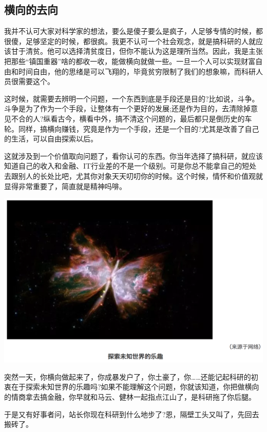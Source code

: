 \documentclass[]{book}
\begin{document}
\hypertarget{ux6a2aux5411ux7684ux53bbux5411}{%
\subsection{横向的去向}\label{ux6a2aux5411ux7684ux53bbux5411}}

我并不认可大家对科学家的想法，要么是傻子要么是疯子，人足够专情的时候，都很傻，足够坚定的时候，都很疯。我更不认可一个社会观念，就是搞科研的人就应该甘于清贫。他可以选择清贫度日，但你不能认为这是理所当然。因此，我是主张把那些``镇国重器''啥的都收一收，能做横向就做一些。一旦一个人可以实现财富自由和时间自由，他的思绪是可以飞翔的，毕竟贫穷限制了我们的想象嘛，而科研人员很需要这个。

这时候，就需要去辨明一个问题，一个东西到底是手段还是目的?比如说，斗争。斗争是为了作为一个手段，让整体有一个更好的发展;还是作为目的，去清除掉意见不合的人?纵看古今，横看中外，搞不清这个问题的，最后都只是倒历史的车轮。同样，搞横向赚钱，究竟是作为一个手段，还是一个目的?尤其是改善了自己的生活，可以自由探索以后。

这就涉及到一个价值取向问题了，看你认可的东西。你当年选择了搞科研，就应该知道自己的收入和金融、IT行业差的不是一个级别。可是你总不能拿自己的短处去跟别人的长处比吧，尤其你对象天天叨叨你的时候。这个时候，情怀和价值观就显得非常重要了，简直就是精神吗啡。

\includegraphics[width=8.33in]{images/kq3}

突然一天，你横向做起来了，你成暴发户了，你土豪了，你\ldots{}\ldots{}还能记起科研的初衷在于探索未知世界的乐趣吗?如果不能理解这个问题，你就该知道，你把做横向的情商拿去搞金融，你早就和马云、健林一起指点江山了，是科研拖了你后腿。

于是又有好事者问，站长你现在科研到什么地步了?恩，隔壁工头又叫了，先回去搬砖了。
\end{document}
